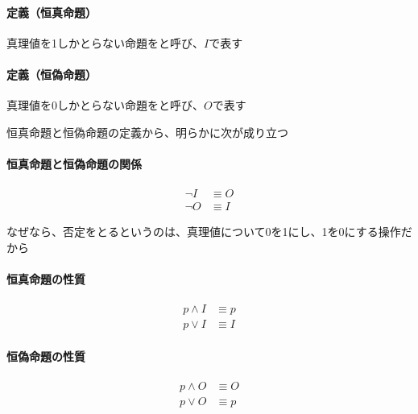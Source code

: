 \documentclass[../book_ronri-and-set]{subfiles}
\begin{document}
\begin{oframed}
  \paragraph{定義（恒真命題）}
  真理値を1しかとらない命題をと呼び、$I$で表す
\end{oframed}

\begin{oframed}
  \paragraph{定義（恒偽命題）}
  真理値を0しかとらない命題をと呼び、$O$で表す
\end{oframed}

\sectionline

恒真命題と恒偽命題の定義から、明らかに次が成り立つ

\begin{oframed}
  \paragraph{恒真命題と恒偽命題の関係}
  \begin{align*}
    \neg I & \equiv O \\
    \neg O & \equiv I
  \end{align*}
\end{oframed}

なぜなら、否定をとるというのは、真理値について0を1にし、1を0にする操作だから

\sectionline

\begin{oframed}
  \paragraph{恒真命題の性質}
  \begin{align*}
    p \land I & \equiv p \\
    p \lor I  & \equiv I
  \end{align*}
\end{oframed}

\begin{oframed}
  \paragraph{恒偽命題の性質}
  \begin{align*}
    p \land O & \equiv O \\
    p \lor O  & \equiv p
  \end{align*}
\end{oframed}
\end{document}
